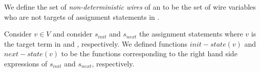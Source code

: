 \begin{definition}
We define the set of {\em non-deterministic wires} of 
an \caig to be the set of wire variables who are not 
targets of assignment statements in .
\end{definition}



\begin{definition}
Consider $v\in V$ and consider $s_{init}$ and $s_{next}$ 
the assignment statements where $v$ is the target term in 
 and , respectively. 
We defined 
functions $\mathit{init-state}(v)$ and 
$\mathit{next-state}(v)$ 
to be the functions corresponding to the right hand side 
expressions of $s_{init}$ and $s_{next}$, respectively. 
\end{definition}

